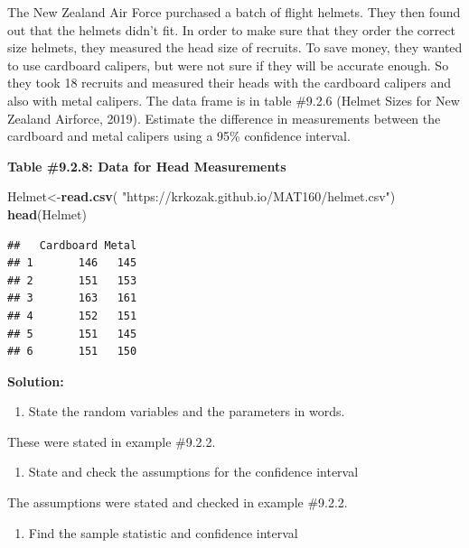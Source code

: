 \documentclass[
]{book}
\newenvironment{Shaded}{\begin{snugshade}}{\end{snugshade}}
\newcommand{\KeywordTok}[1]{\textcolor[rgb]{0.13,0.29,0.53}{\textbf{#1}}}
\newcommand{\NormalTok}[1]{#1}
\newcommand{\StringTok}[1]{\textcolor[rgb]{0.31,0.60,0.02}{#1}}
\providecommand{\tightlist}{%
  \setlength{\itemsep}{0pt}\setlength{\parskip}{0pt}}
\begin{document}
The New Zealand Air Force purchased a batch of flight helmets. They then found out that the helmets didn't fit. In order to make sure that they order the correct size helmets, they measured the head size of recruits. To save money, they wanted to use cardboard calipers, but were not sure if they will be accurate enough. So they took 18 recruits and measured their heads with the cardboard calipers and also with metal calipers. The data frame is in table \#9.2.6 (Helmet Sizes for New Zealand Airforce, 2019). Estimate the difference in measurements between the cardboard and metal calipers using a 95\% confidence interval.

\textbf{Table \#9.2.8: Data for Head Measurements}

\begin{Shaded}
\begin{Highlighting}[]
\NormalTok{Helmet<-}\KeywordTok{read.csv}\NormalTok{(}
  \StringTok{"https://krkozak.github.io/MAT160/helmet.csv"}\NormalTok{)}
\KeywordTok{head}\NormalTok{(Helmet)}
\end{Highlighting}
\end{Shaded}

\begin{verbatim}
##   Cardboard Metal
## 1       146   145
## 2       151   153
## 3       163   161
## 4       152   151
## 5       151   145
## 6       151   150
\end{verbatim}

\textbf{Solution:}

\begin{enumerate}
\def\labelenumi{\arabic{enumi}.}
\tightlist
\item
  State the random variables and the parameters in words.
\end{enumerate}

These were stated in example \#9.2.2.

\begin{enumerate}
\def\labelenumi{\arabic{enumi}.}
\setcounter{enumi}{1}
\tightlist
\item
  State and check the assumptions for the confidence interval
\end{enumerate}

The assumptions were stated and checked in example \#9.2.2.

\begin{enumerate}
\def\labelenumi{\arabic{enumi}.}
\setcounter{enumi}{2}
\tightlist
\item
  Find the sample statistic and confidence interval
\end{enumerate}
\end{document}
